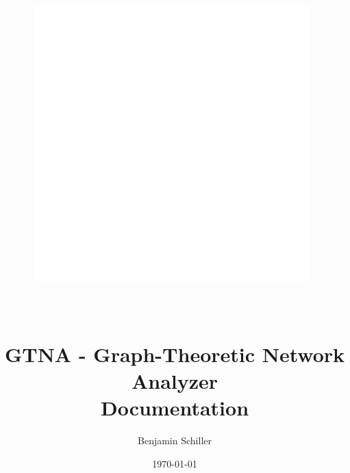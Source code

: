 \documentclass[10pt,a4paper]{article}
\title{\includegraphics[width=0.8\textwidth]{GTNA_Logo_RGB}$\;$\\ $\;$\\ $\;$\\ GTNA - Graph-Theoretic Network Analyzer \\ Documentation}
\author{Benjamin Schiller}
\date{\today}
\begin{document}
\maketitle

\pagebreak
\tableofcontents




















\appendix





%
%
%

%
\end{document}
